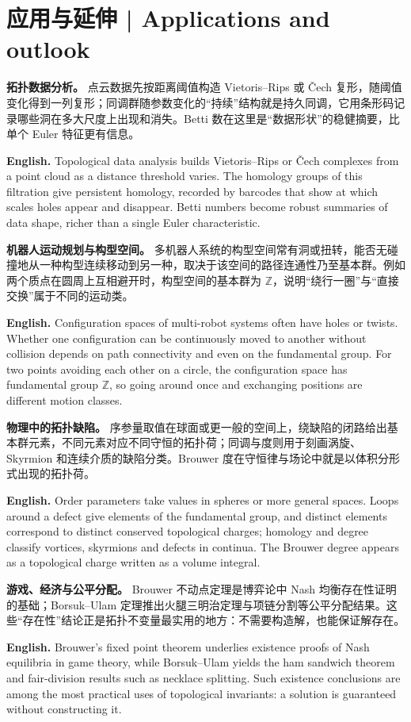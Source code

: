 \documentclass[UTF8,11pt,a4paper]{ctexart}
\newcommand{\EN}[1]{\par\noindent\textbf{English.} #1\par}
\begin{document}
\section{应用与延伸 | Applications and outlook}
\noindent\textbf{拓扑数据分析。} 点云数据先按距离阈值构造 Vietoris--Rips 或 Čech 复形，随阈值变化得到一列复形；同调群随参数变化的“持续”结构就是持久同调，它用条形码记录哪些洞在多大尺度上出现和消失。Betti 数在这里是“数据形状”的稳健摘要，比单个 Euler 特征更有信息。
\EN{Topological data analysis builds Vietoris--Rips or Čech complexes from a point cloud as a distance threshold varies. The homology groups of this filtration give persistent homology, recorded by barcodes that show at which scales holes appear and disappear. Betti numbers become robust summaries of data shape, richer than a single Euler characteristic.}

\noindent\textbf{机器人运动规划与构型空间。} 多机器人系统的构型空间常有洞或扭转，能否无碰撞地从一种构型连续移动到另一种，取决于该空间的路径连通性乃至基本群。例如两个质点在圆周上互相避开时，构型空间的基本群为 $\mathbb Z$，说明“绕行一圈”与“直接交换”属于不同的运动类。
\EN{Configuration spaces of multi-robot systems often have holes or twists. Whether one configuration can be continuously moved to another without collision depends on path connectivity and even on the fundamental group. For two points avoiding each other on a circle, the configuration space has fundamental group $\mathbb Z$, so going around once and exchanging positions are different motion classes.}

\noindent\textbf{物理中的拓扑缺陷。} 序参量取值在球面或更一般的空间上，绕缺陷的闭路给出基本群元素，不同元素对应不同守恒的拓扑荷；同调与度则用于刻画涡旋、Skyrmion 和连续介质的缺陷分类。Brouwer 度在守恒律与场论中就是以体积分形式出现的拓扑荷。
\EN{Order parameters take values in spheres or more general spaces. Loops around a defect give elements of the fundamental group, and distinct elements correspond to distinct conserved topological charges; homology and degree classify vortices, skyrmions and defects in continua. The Brouwer degree appears as a topological charge written as a volume integral.}

\noindent\textbf{游戏、经济与公平分配。} Brouwer 不动点定理是博弈论中 Nash 均衡存在性证明的基础；Borsuk--Ulam 定理推出火腿三明治定理与项链分割等公平分配结果。这些“存在性”结论正是拓扑不变量最实用的地方：不需要构造解，也能保证解存在。
\EN{Brouwer's fixed point theorem underlies existence proofs of Nash equilibria in game theory, while Borsuk--Ulam yields the ham sandwich theorem and fair-division results such as necklace splitting. Such existence conclusions are among the most practical uses of topological invariants: a solution is guaranteed without constructing it.}
\end{document}
